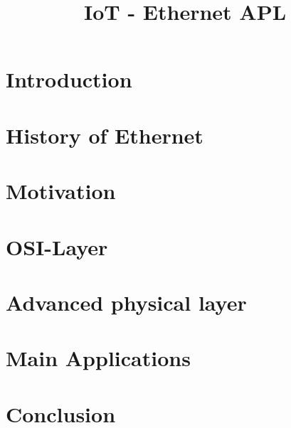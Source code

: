 \documentclass[conference]{IEEEtran}
\begin{document}
\title{IoT - Ethernet APL\\
}

\author{

}

\maketitle

\begin{abstract}
 
\end{abstract}

\begin{IEEEkeywords}

\end{IEEEkeywords}

\section{Introduction}



\section{History of Ethernet}

\section{Motivation}


\section{OSI-Layer}

\section{Advanced physical layer}

\section{Main Applications}

\section{Conclusion}




\begin{thebibliography}{00}
\end{thebibliography}
\end{document}

